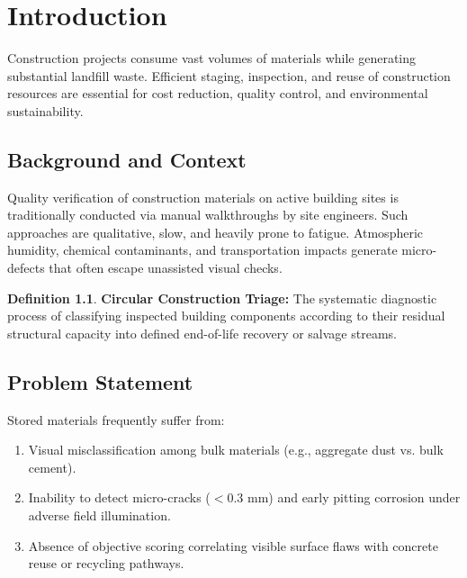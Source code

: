 \documentclass[12pt,a4paper]{report}
\theoremstyle{definition}
\newtheorem{definition}{Definition}[section]
\begin{document}
\newpage

\tableofcontents
\newpage
\listoffigures
\newpage
\listoftables
\newpage

\setcounter{page}{1}

\chapter{Introduction}
Construction projects consume vast volumes of materials while generating substantial landfill waste. Efficient staging, inspection, and reuse of construction resources are essential for cost reduction, quality control, and environmental sustainability.

\section{Background and Context}
Quality verification of construction materials on active building sites is traditionally conducted via manual walkthroughs by site engineers. Such approaches are qualitative, slow, and heavily prone to fatigue. Atmospheric humidity, chemical contaminants, and transportation impacts generate micro-defects that often escape unassisted visual checks.

\begin{definition}
\textbf{Circular Construction Triage:} The systematic diagnostic process of classifying inspected building components according to their residual structural capacity into defined end-of-life recovery or salvage streams.
\end{definition}

\section{Problem Statement}
Stored materials frequently suffer from:
\begin{enumerate}
    \item Visual misclassification among bulk materials (e.g., aggregate dust vs. bulk cement).
    \item Inability to detect micro-cracks ($<0.3$ mm) and early pitting corrosion under adverse field illumination.
    \item Absence of objective scoring correlating visible surface flaws with concrete reuse or recycling pathways.
\end{enumerate}
\end{document}
